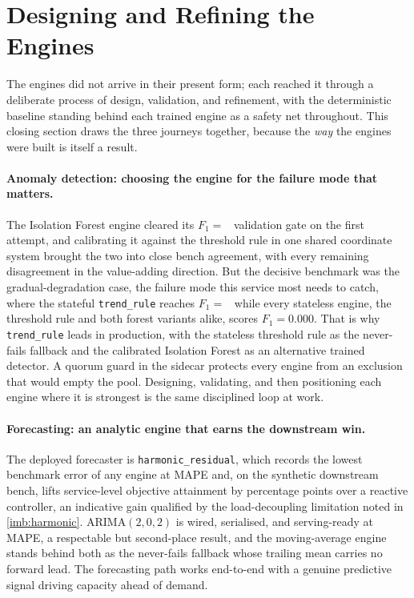 \section{Designing and Refining the Engines}\label{imb:iteration}

The engines did not arrive in their present form; each reached it through a
deliberate process of design, validation, and refinement, with the deterministic
baseline standing behind each trained engine as a safety net throughout. This
closing section draws the three journeys together, because the \emph{way} the
engines were built is itself a result.

\paragraph{Anomaly detection: choosing the engine for the failure mode that
matters.} The Isolation Forest engine cleared its $F_1 =$~\BMifFone{} validation
gate on the first attempt, and calibrating it against the threshold rule in one
shared coordinate system brought the two into close bench agreement, with every
remaining disagreement in the value-adding direction. But the decisive benchmark
was the gradual-degradation case, the failure mode this service most needs to
catch, where the stateful \texttt{trend\_rule} reaches $F_1 =$~\BManFone{} while
every stateless engine, the threshold rule and both forest variants alike, scores
$F_1 = 0.000$. That is why \texttt{trend\_rule} leads in production, with the
stateless threshold rule as the never-fails fallback and the calibrated Isolation
Forest as an alternative trained detector. A quorum guard in the sidecar protects
every engine from an exclusion that would empty the pool. Designing, validating,
and then positioning each engine where it is strongest is the same disciplined loop
at work.

\paragraph{Forecasting: an analytic engine that earns the downstream win.} The
deployed forecaster is \texttt{harmonic\_residual}, which records the lowest
benchmark error of any engine at \BMfcMape{} MAPE and, on the synthetic downstream
bench, lifts service-level objective attainment by \BMfcSlaGain{} percentage points
over a reactive controller, an indicative gain qualified by the load-decoupling
limitation noted in \cref{imb:harmonic}. ARIMA$(2,0,2)$ is wired, serialised, and serving-ready
at \BMfcMapeArima{} MAPE, a respectable but second-place result, and the
moving-average engine stands behind both as the never-fails fallback whose trailing
mean carries no forward lead. The forecasting path works end-to-end with a genuine
predictive signal driving capacity ahead of demand.

